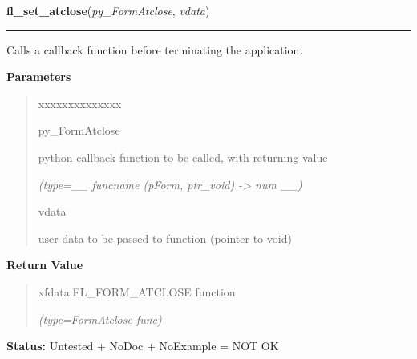    \vspace{0.5ex}

\hspace{.8\funcindent}\begin{boxedminipage}{\funcwidth}

    \raggedright \textbf{fl\_set\_atclose}(\textit{py\_FormAtclose}, \textit{vdata})

    \vspace{-1.5ex}

    \rule{\textwidth}{0.5\fboxrule}
\setlength{\parskip}{2ex}
    Calls a callback function before terminating the application.

\setlength{\parskip}{1ex}
      \textbf{Parameters}
      \vspace{-1ex}

      \begin{quote}
        \begin{Ventry}{xxxxxxxxxxxxxx}

          \item[py\_FormAtclose]

          python callback function to be called, with returning value

            {\it (type=\_\_ funcname (pForm, ptr\_void) -{\textgreater} num \_\_)}

          \item[vdata]

          user data to be passed to function (pointer to void)

        \end{Ventry}

      \end{quote}

      \textbf{Return Value}
    \vspace{-1ex}

      \begin{quote}
      xfdata.FL\_FORM\_ATCLOSE function

      {\it (type=FormAtclose func)}

      \end{quote}

\textbf{Status:} Untested + NoDoc + NoExample = NOT OK



    \end{boxedminipage}

    \label{xformslib:library:fl_set_form_atactivate}

